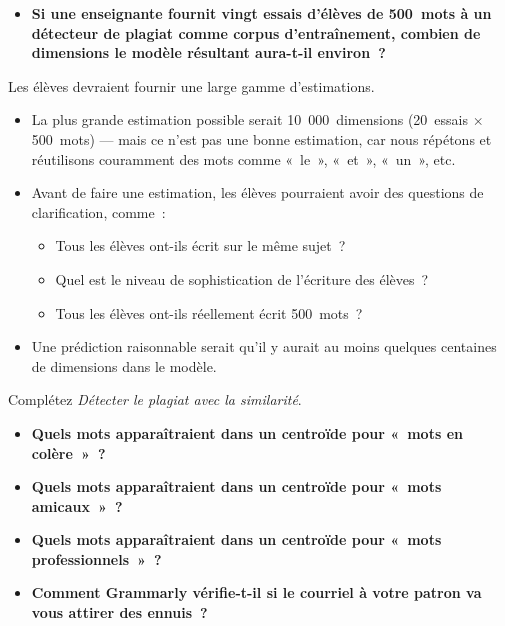 \documentclass[12pt,a4paper]{article}
\begin{document}
\begin{thinkbox}
  \begin{itemize}
    \item \textbf{Si une enseignante fournit vingt essais d'élèves de 500~mots à un détecteur de plagiat comme corpus d'entraînement, combien de dimensions le modèle résultant aura-t-il environ~?}
  \end{itemize}

  Les élèves devraient fournir une large gamme d'estimations.
  \begin{itemize}
    \item La plus grande estimation possible serait 10~000~dimensions (20~essais $\times$ 500~mots) — mais ce n'est pas une bonne estimation, car nous répétons et réutilisons couramment des mots comme «~le~», «~et~», «~un~», etc.
    \item Avant de faire une estimation, les élèves pourraient avoir des questions de clarification, comme~:
    \begin{itemize}
      \item Tous les élèves ont-ils écrit sur le même sujet~?
      \item Quel est le niveau de sophistication de l'écriture des élèves~?
      \item Tous les élèves ont-ils réellement écrit 500~mots~?
    \end{itemize}
    \item Une prédiction raisonnable serait qu'il y aurait au moins quelques centaines de dimensions dans le modèle.
  \end{itemize}
\end{thinkbox}

\begin{activitybox}
  Complétez \emph{Détecter le plagiat avec la similarité}.
\end{activitybox}

\begin{thinkbox}
  \begin{itemize}
    \item \textbf{Quels mots apparaîtraient dans un centroïde pour «~mots en colère~»~?}
    \item \textbf{Quels mots apparaîtraient dans un centroïde pour «~mots amicaux~»~?}
    \item \textbf{Quels mots apparaîtraient dans un centroïde pour «~mots professionnels~»~?}
    \item \textbf{Comment Grammarly vérifie-t-il si le courriel à votre patron va vous attirer des ennuis~?}
  \end{itemize}
\end{thinkbox}
\end{document}
